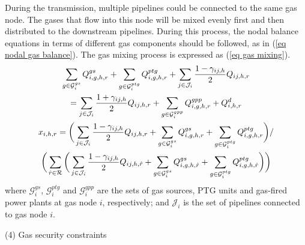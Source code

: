 \documentclass[sn-mathphys,Numbered]{sn-jnl}%
\theoremstyle{plain}%
\theoremstyle{definition}%
\theoremstyle{remark}%
\begin{document}
During the transmission, multiple pipelines could be connected to the same gas node. The gases that flow into this node will be mixed evenly first and then distributed to the downstream pipelines. During this process, the nodal balance equations in terms of different gas components should be followed, as in (\ref{eq nodal gas balance}). The gas mixing process is expressed as (\ref{eq gas mixing}).
\begin{gather}
    \sum_{g\in \mathcal{G}_i^{gs}} {Q_{i,g,h,r}^{gs}} + \sum_{g \in \mathcal{G}_i^{ptg}}{Q_{i,g,h,r}^{ptg}}
    + \sum_{j \in \mathcal{J}_i}{\frac{1-\gamma_{ij,h}}{2} Q_{ij,h,r}} \notag \\
    = \sum_{j \in \mathcal{J}_i}{\frac{1+\gamma_{ij,h}}{2} Q_{ij,h,r} } +
    \sum_{g \in \mathcal{G}_i^{gpp}} Q_{i,g,h,r}^{gpp}
    + Q_{i,h,r}^{d}
\label{eq nodal gas balance} \\
    x_{i,h,r} = \bigg( \sum_{j \in \mathcal{J}_i} {\frac{1-\gamma_{ij,h}}{2} Q_{ij,h,r}}
    + \sum_{g\in \mathcal{G}_i^{gs}} {Q_{i,g,h,r}^{gs}}
    + \sum_{g\in \mathcal{G}_i^{ptg}} {Q_{i,g,h,r}^{ptg}} \bigg) /
\notag \\
    \bigg( \sum_{\hat r \in \mathcal{R}} \bigg( \sum_{j \in \mathcal{J}_i} {\frac{1-\gamma_{ij,h}}{2} Q_{ij,h,\hat r}}
    + \sum_{g\in \mathcal{G}_i^{gs}} {Q_{i,g,h,\hat r}^{gs}}
    + \sum_{g\in \mathcal{G}_i^{ptg}} {Q_{i,g,h,\hat r}^{ptg}} \bigg) \bigg)
\label{eq gas mixing}
\end{gather}
where $\mathcal{G}_i^{gs}$, $\mathcal{G}_i^{ptg}$ and $\mathcal{G}_i^{gpp}$ are the sets of gas sources, PTG units and gas-fired power plants at gas node $i$, respectively; and $\mathcal{J}_i$ is the set of pipelines connected to gas node $i$.

(4) Gas security constraints
\end{document}

